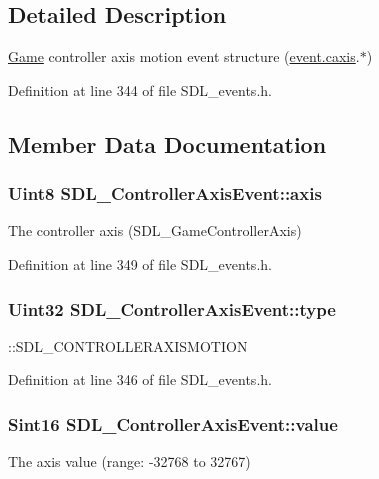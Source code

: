 \subsection{Detailed Description}
\hyperlink{classGame}{Game} controller axis motion event structure (\hyperlink{unionSDL__Event_aa8f6df0f2716fae56204b12ab4a4c289}{event.\+caxis}.$\ast$) 

Definition at line 344 of file S\+D\+L\+\_\+events.\+h.



\subsection{Member Data Documentation}
\hypertarget{structSDL__ControllerAxisEvent_aba6543c143521aebce06a41a8cf79db0}{
\subsubsection[{axis}]{\setlength{\rightskip}{0pt plus 5cm}Uint8 S\+D\+L\+\_\+\+Controller\+Axis\+Event\+::axis}}\label{structSDL__ControllerAxisEvent_aba6543c143521aebce06a41a8cf79db0}
The controller axis (S\+D\+L\+\_\+\+Game\+Controller\+Axis) 

Definition at line 349 of file S\+D\+L\+\_\+events.\+h.

\hypertarget{structSDL__ControllerAxisEvent_aa904b61e4763d28d887cf8afcc3cbb7c}{
\subsubsection[{type}]{\setlength{\rightskip}{0pt plus 5cm}Uint32 S\+D\+L\+\_\+\+Controller\+Axis\+Event\+::type}}\label{structSDL__ControllerAxisEvent_aa904b61e4763d28d887cf8afcc3cbb7c}
\+::\+S\+D\+L\+\_\+\+C\+O\+N\+T\+R\+O\+L\+L\+E\+R\+A\+X\+I\+S\+M\+O\+T\+I\+O\+N 

Definition at line 346 of file S\+D\+L\+\_\+events.\+h.

\hypertarget{structSDL__ControllerAxisEvent_a1ed7f14255ed01b982d40a38791d475a}{
\subsubsection[{value}]{\setlength{\rightskip}{0pt plus 5cm}Sint16 S\+D\+L\+\_\+\+Controller\+Axis\+Event\+::value}}\label{structSDL__ControllerAxisEvent_a1ed7f14255ed01b982d40a38791d475a}
The axis value (range\+: -\/32768 to 32767) 

